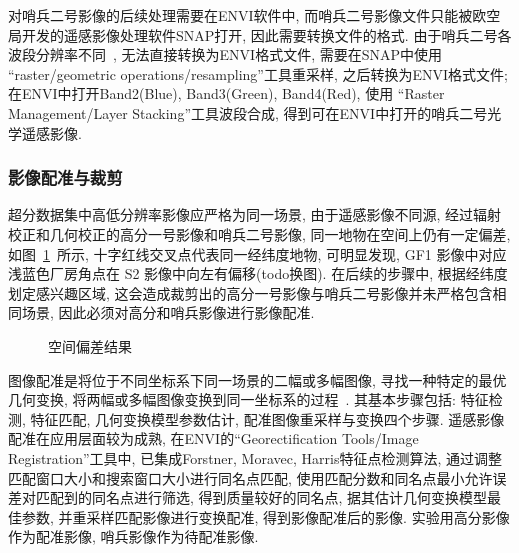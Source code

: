 对哨兵二号影像的后续处理需要在ENVI软件中, 而哨兵二号影像文件只能被欧空局开发的遥感影像处理软件SNAP打开, 因此需要转换文件的格式. 由于哨兵二号各波段分辨率不同~\cite{S2handbook}, 无法直接转换为ENVI格式文件, 需要在SNAP中使用 ``raster/geometric operations/resampling''工具重采样, 之后转换为ENVI格式文件; 在ENVI中打开Band2(Blue), Band3(Green), Band4(Red), 使用 ``Raster Management/Layer Stacking''工具波段合成, 得到可在ENVI中打开的哨兵二号光学遥感影像. 

\subsubsection{影像配准与裁剪}
超分数据集中高低分辨率影像应严格为同一场景, 由于遥感影像不同源, 经过辐射校正和几何校正的高分一号影像和哨兵二号影像, 同一地物在空间上仍有一定偏差, 如图~\ref{fig:0209}~所示, 十字红线交叉点代表同一经纬度地物, 可明显发现, GF1 影像中对应浅蓝色厂房角点在 S2 影像中向左有偏移(todo换图). 在后续的步骤中, 根据经纬度划定感兴趣区域, 这会造成裁剪出的高分一号影像与哨兵二号影像并未严格包含相同场景, 因此必须对高分和哨兵影像进行影像配准. 

\begin{figure}[!htbp]
    \centering
    \quad
    \caption{空间偏差结果}
    \label{fig:0209}
\end{figure}

图像配准是将位于不同坐标系下同一场景的二幅或多幅图像, 寻找一种特定的最优几何变换, 将两幅或多幅图像变换到同一坐标系的过程~\cite{ImageReg}. 其基本步骤包括: 特征检测, 特征匹配, 几何变换模型参数估计, 配准图像重采样与变换四个步骤. 遥感影像配准在应用层面较为成熟, 在ENVI的``Georectification Tools/Image Registration''工具中, 已集成Forstner, Moravec, Harris特征点检测算法, 通过调整匹配窗口大小和搜索窗口大小进行同名点匹配, 使用匹配分数和同名点最小允许误差对匹配到的同名点进行筛选, 得到质量较好的同名点, 据其估计几何变换模型最佳参数, 并重采样匹配影像进行变换配准, 得到影像配准后的影像. 实验用高分影像作为配准影像, 哨兵影像作为待配准影像.  

